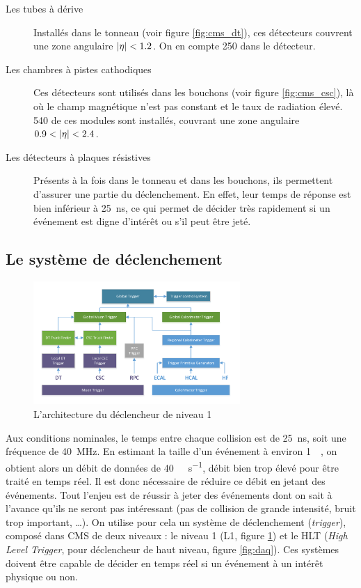\begin{description}
  \item[Les tubes à dérive] Installés dans le tonneau (voir figure \ref{fig:cms_dt}), ces détecteurs couvrent une zone angulaire $\lvert \eta \rvert < 1.2$. On en compte 250 dans le détecteur.
  \item[Les chambres à pistes cathodiques] Ces détecteurs sont utilisés dans les bouchons (voir figure \ref{fig:cms_csc}), là où le champ magnétique n'est pas constant et le taux de radiation élevé. 540 de ces modules sont installés, couvrant une zone angulaire $\num{0.9} < \lvert \eta \rvert < \num{2.4}$.
  \item[Les détecteurs à plaques résistives] Présents à la fois dans le tonneau et dans les bouchons, ils permettent d'assurer une partie du déclenchement. En effet, leur temps de réponse est bien inférieur à \SI{25}{\ns}, ce qui permet de décider très rapidement si un événement est digne d’intérêt ou s'il peut être jeté.
\end{description}


\subsection{Le système de déclenchement}

\begin{figure} \centering
  \includegraphics[width=0.7\textwidth]{chapitre2/figs/L1.pdf}
  \caption{L'architecture du déclencheur de niveau 1}
  \label{fig:l1}
\end{figure}

Aux conditions nominales, le temps entre chaque collision est de \SI{25}{\ns}, soit une fréquence de \SI{40}{\mega\hertz}. En estimant la taille d'un événement à environ \SI{1}{\mega\octet}, on obtient alors un débit de données de \SI{40}{\tera\octet\per\second}, débit bien trop élevé pour être traité en temps réel. Il est donc nécessaire de réduire ce débit en jetant des événements. Tout l'enjeu est de réussir à jeter des événements dont on sait à l'avance qu'ils ne seront pas intéressant (pas de collision de grande intensité, bruit trop important, \ldots). On utilise pour cela un système de déclenchement (\emph{trigger}), composé dans CMS de deux niveaux : le niveau 1 (L1, figure \ref{fig:l1}) et le HLT (\emph{High Level Trigger}, pour déclencheur de haut niveau, figure \ref{fig:daq}). Ces systèmes doivent être capable de décider en temps réel si un événement à un intérêt physique ou non.


